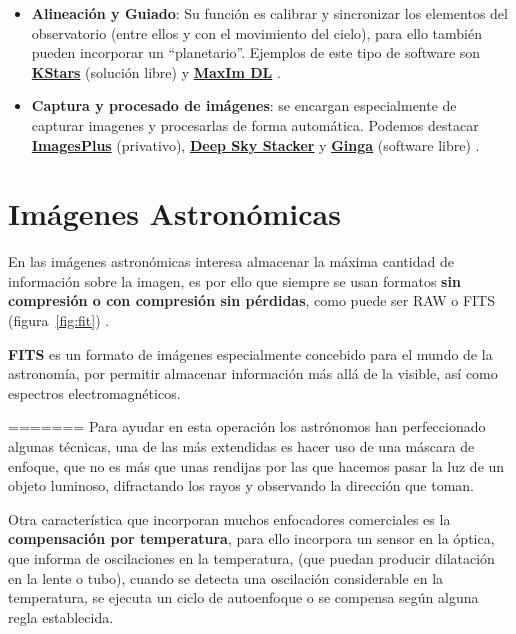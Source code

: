 \begin{itemize}
\begin{itemize}
\begin{itemize}
	\item \textbf{Alineación y Guiado}: Su función es calibrar y sincronizar los elementos del observatorio (entre ellos y con el movimiento del cielo), para ello también pueden incorporar un ``planetario''. Ejemplos de este tipo de software son \href{https://edu.kde.org/kstars/}{\textbf{KStars}} \cite{kstars} (solución libre) y \href{http://www.cyanogen.com/maxim_main.php}{\textbf{MaxIm DL}} \cite{maximdl}.
	
	\item \textbf{Captura y procesado de imágenes}: se encargan especialmente de capturar imagenes y procesarlas de forma automática. Podemos destacar \href{http://www.mlunsold.com/}{\textbf{ImagesPlus}} (privativo), \href{http://deepskystacker.free.fr/spanish/index.html}{\textbf{Deep Sky Stacker}} y \href{https://github.com/ejeschke/ginga}{\textbf{Ginga}} (software libre) \cite{ginga}. 
	
	
\end{itemize}

\section{Imágenes Astronómicas}

En las imágenes astronómicas interesa almacenar la máxima cantidad de información sobre la imagen, es por ello que siempre se usan formatos \textbf{sin compresión o con compresión sin pérdidas}, como puede ser RAW \cite{Raw} o FITS (figura~\ref{fig:fit}) \cite{FITS}.


\textbf{FITS} es un formato de imágenes especialmente concebido para el mundo de la astronomía, por permitir almacenar información más allá de la visible, así como espectros electromagnéticos.

=======
\bigskip
Para ayudar en esta operación los astrónomos han perfeccionado algunas técnicas, una de las más extendidas es hacer uso de una máscara de enfoque, \cite{FocusMascara} que no es más que unas rendijas por las que hacemos pasar la luz de un objeto luminoso, difractando los rayos y observando la dirección que toman.

\bigskip
Otra característica que incorporan muchos enfocadores comerciales es la \textbf{compensación por temperatura}, para ello incorpora un sensor en la óptica, que informa de  oscilaciones en la temperatura, (que puedan producir dilatación en la lente o tubo), 
cuando se detecta una oscilación considerable en la temperatura, se ejecuta un ciclo de autoenfoque o se compensa según alguna regla establecida.



\end{itemize}
\end{itemize}
